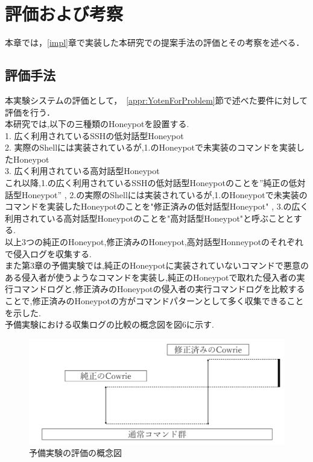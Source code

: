 \chapter{評価および考察}
\label{eval}

本章では，\ref{impl}章で実装した本研究での提案手法の評価とその考察を述べる．

\section{評価手法}
\label{eval:meth}

本実験システムの評価として，~\ref{appr:YotenForProblem}節で述べた要件に対して評価を行う．\\

本研究では,以下の三種類のHoneypotを設置する.\\
1. 広く利用されているSSHの低対話型Honeypot\\
2. 実際のShellには実装されているが,1.のHoneypotで未実装のコマンドを実装したHoneypot\\
3. 広く利用されている高対話型Honeypot\\

これ以降,1.の広く利用されているSSHの低対話型Honeypotのことを”純正の低対話型Honeypot” , 2.の実際のShellには実装されているが,1.のHoneypotで未実装のコマンドを実装したHoneypotのことを"修正済みの低対話型Honeypot" , 3.の広く利用されている高対話型Honeypotのことを"高対話型Honeypot"と呼ぶこととする.\\

以上3つの純正のHoneypot,修正済みのHoneypot,高対話型Honneypotのそれぞれで侵入ログを収集する.\\

また第3章の予備実験では,純正のHoneypotに実装されていないコマンドで悪意のある侵入者が使うようなコマンドを実装し,純正のHoneypotで取れた侵入者の実行コマンドログと,修正済みのHoneypotの侵入者の実行コマンドログを比較することで,修正済みのHoneypotの方がコマンドパターンとして多く収集できることを示した.\\
予備実験における収集ログの比較の概念図を図6に示す.

\begin{figure}[H]
    \centering
    \includegraphics[width=1.0\textwidth]{figures/termhyoka.png}
    \caption{予備実験の評価の概念図}
    \label{fig:evo}
\end{figure}

